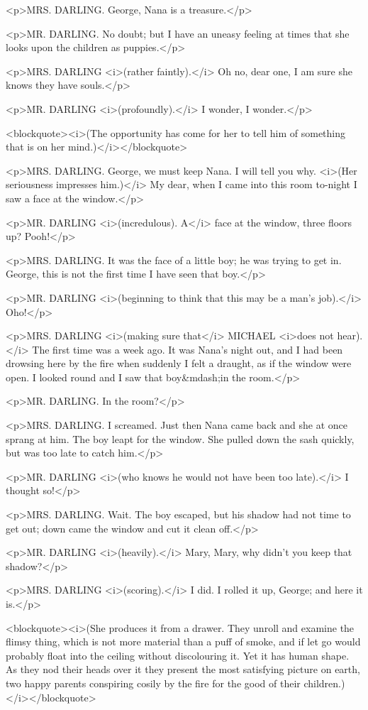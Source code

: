 <p>MRS. DARLING. George, Nana is a treasure.</p>

<p>MR. DARLING. No doubt; but I have an uneasy feeling at times that she looks upon the children as puppies.</p>

<p>MRS. DARLING <i>(rather faintly).</i> Oh no, dear one, I am sure she knows they have souls.</p>

<p>MR. DARLING <i>(profoundly).</i> I wonder, I wonder.</p>

<blockquote><i>(The opportunity has come for her to tell him of something that is on her mind.)</i></blockquote>

<p>MRS. DARLING. George, we must keep Nana. I will tell you why. <i>(Her seriousness impresses him.)</i> My dear, when I came into this room to-night I saw a face at the window.</p>

<p>MR. DARLING <i>(incredulous). A</i> face at the window, three floors up? Pooh!</p>

<p>MRS. DARLING. It was the face of a little boy; he was trying to get in. George, this is not the first time I have seen that boy.</p>

<p>MR. DARLING <i>(beginning to think that this may be a man's job).</i> Oho!</p>

<p>MRS. DARLING <i>(making sure that</i> MICHAEL <i>does not hear).</i> The first time was a week ago. It was Nana's night out, and I had been drowsing here by the fire when suddenly I felt a draught, as if the window were open. I looked round and I saw that boy&mdash;in the room.</p>

<p>MR. DARLING. In the room?</p>

<p>MRS. DARLING. I screamed. Just then Nana came back and she at once sprang at him. The boy leapt for the window. She pulled down the sash quickly, but was too late to catch him.</p>

<p>MR. DARLING <i>(who knows he would not have been too late).</i> I thought so!</p>

<p>MRS. DARLING. Wait. The boy escaped, but his shadow had not time to get out; down came the window and cut it clean off.</p>

<p>MR. DARLING <i>(heavily).</i> Mary, Mary, why didn't you keep that shadow?</p>

<p>MRS. DARLING <i>(scoring).</i> I did. I rolled it up, George; and here it is.</p>

<blockquote><i>(She produces it from a drawer. They unroll and examine the flimsy thing, which is not more material than a puff of smoke, and if let go would probably float into the ceiling without discolouring it. Yet it has human shape. As they nod their heads over it they present the most satisfying picture on earth, two happy parents conspiring cosily by the fire for the good of their children.)</i></blockquote>

